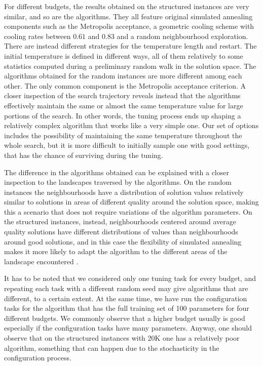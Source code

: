 For different budgets, the results obtained on the structured instances
are very similar, and so are the algorithms. They all feature original simulated annealing components
such as the Metropolis acceptance, a geometric cooling scheme with cooling rates 
between $0.61$ and $0.83$ and a
random neighbourhood exploration.
There are instead different strategies for the temperature length and restart.
The initial temperature is defined in different ways, all of them relatively to 
some statistics computed during a preliminary random walk in the solution space. 
The algorithms obtained for the random instances are more different among each other.
The only common component is the Metropolis acceptance criterion. 
A closer inspection of the search trajectory reveals instead that
the algorithms effectively maintain the same or almost the same temperature value
for large portions of the search. In other words, the tuning process ends up shaping
a relatively complex algorithm that works like a very simple one. Our set of options
includes the possibility of maintaining the same temperature throughout the whole search, 
but it is more difficult to initially sample one with good settings, that has the chance of
surviving during the tuning.

The difference in the algorithms obtained can be explained with a closer
inspection to the landscapes traversed by the algorithms. On the random instances
the neighbourhoods have a distribution of solution values 
relatively similar to solutions in areas of different quality around the solution space, 
making this a scenario
that does not require variations of the algorithm parameters. On the 
structured instances, instead, neighbourhoods centered around average quality solutions
have different distributions of values than neighbourhoods around good solutions, and in this case
the flexibility of simulated annealing makes it more likely to adapt the algorithm to
the different areas of the landscape encountered \cite{IRIDIA-2021-005}.

It has to be noted that we considered only one tuning task for every budget, and
repeating each task with a different random seed may give algorithms that are different,
to a certain extent. At the same time, we have run the configuration tasks for the algorithm 
that has the full training set of 100 parameters for four different budgets. We commonly observe 
that a higher budget usually is good especially if the configuration tasks have many parameters. 
Anyway, one should observe that on the structured instances with 20K one has a relatively 
poor algorithm, 
something that can happen due to the stochasticity in the configuration process.



